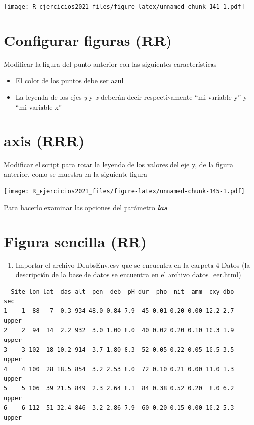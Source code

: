 \documentclass[]{book}
\providecommand{\tightlist}{%
  \setlength{\itemsep}{0pt}\setlength{\parskip}{0pt}}
\begin{document}
\texttt{[image: R\_ejercicios2021\_files/figure-latex/unnamed-chunk-141-1.pdf]}

\hypertarget{configurar-figuras-rr}{%
\section{Configurar figuras (RR)}\label{configurar-figuras-rr}}

Modificar la figura del punto anterior con las siguientes características

\begin{itemize}
\tightlist
\item
  El color de los puntos debe ser azul
\item
  La leyenda de los ejes \emph{y} y \emph{x} deberán decir respectivamente ``mi variable y'' y ``mi variable x''
\end{itemize}

\hypertarget{axis-rrr}{%
\section{axis (RRR)}\label{axis-rrr}}

Modificar el script para rotar la leyenda de los valores del eje y, de la figura anterior, como se muestra en la siguiente figura

\texttt{[image: R\_ejercicios2021\_files/figure-latex/unnamed-chunk-145-1.pdf]}

Para hacerlo examinar las opciones del parámetro \textbf{\emph{las}}

\hypertarget{figura-sencilla-rr}{%
\section{Figura sencilla (RR)}\label{figura-sencilla-rr}}

\begin{enumerate}
\def\labelenumi{\arabic{enumi}.}
\tightlist
\item
  Importar el archivo DoubsEnv.csv que se encuentra en la carpeta 4-Datos (la descripción de la base de datos se encuentra en el archivo \url{datos_eer.html})
\end{enumerate}

\begin{verbatim}
  Site lon lat  das alt  pen  deb  pH dur  pho  nit  amm  oxy dbo   sec
1    1  88   7  0.3 934 48.0 0.84 7.9  45 0.01 0.20 0.00 12.2 2.7 upper
2    2  94  14  2.2 932  3.0 1.00 8.0  40 0.02 0.20 0.10 10.3 1.9 upper
3    3 102  18 10.2 914  3.7 1.80 8.3  52 0.05 0.22 0.05 10.5 3.5 upper
4    4 100  28 18.5 854  3.2 2.53 8.0  72 0.10 0.21 0.00 11.0 1.3 upper
5    5 106  39 21.5 849  2.3 2.64 8.1  84 0.38 0.52 0.20  8.0 6.2 upper
6    6 112  51 32.4 846  3.2 2.86 7.9  60 0.20 0.15 0.00 10.2 5.3 upper
\end{verbatim}
\end{document}

